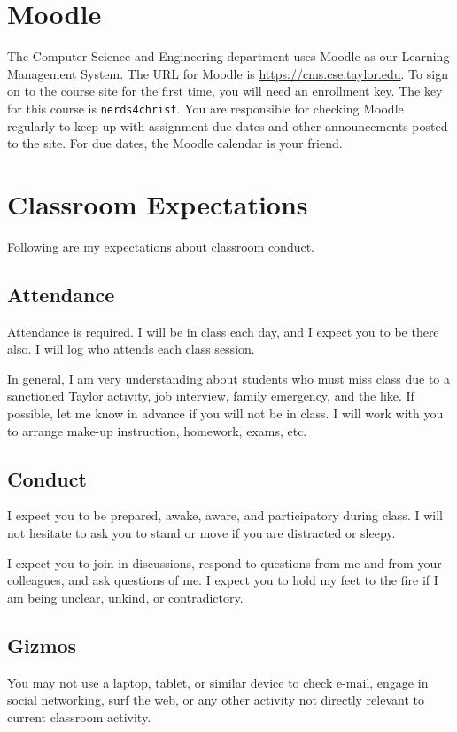 \documentclass{article}
\begin{document}
\section{Moodle}
\label{sec-6}
The Computer Science and Engineering department uses Moodle as our Learning Management
System.
The URL for Moodle is \url{https://cms.cse.taylor.edu}.
To sign on to the course site for the first time, you will need an enrollment key.
The key for this course is \texttt{nerds4christ}.
You are responsible for checking Moodle regularly to keep up with assignment due dates
and other announcements posted to the site.
For due dates, the Moodle calendar is your friend.
\section{Classroom Expectations}
\label{sec-7}
Following are my expectations about classroom conduct.
\subsection{Attendance}
\label{sec-7-1}
Attendance is required. I will be in class each day, and I expect you to be there also. I
will log who attends each class session.

In general, I am very understanding about students who must miss class due to a sanctioned
Taylor activity, job interview, family emergency, and the like. If possible, let me know
in advance if you will not be in class. I will work with you to arrange make-up
instruction, homework, exams, etc.
\subsection{Conduct}
\label{sec-7-2}
I expect you to be prepared, awake, aware, and participatory during class. I will not
hesitate to ask you to stand or move if you are distracted or sleepy.

I expect you to join in discussions, respond to questions from me and from your
colleagues, and ask questions of me. I expect you to hold my feet to the fire if I am
being unclear, unkind, or contradictory.
\subsection{Gizmos}
\label{sec-7-3}
You may not use a laptop, tablet, or similar device to check e-mail, engage in social
networking, surf the web, or any other activity not directly relevant to current classroom
activity.
\end{document}
